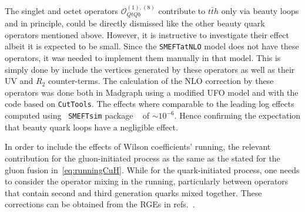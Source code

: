 %
\par The singlet and octet operators $\mathcal{O}_{QtQb}^{(1),(8)}$  contribute to $t \bar{t} h$ only via beauty loops and in principle, could be directly dismissed like the other beauty quark operators mentioned above. However, it is instructive to investigate their effect albeit it is expected to be small.
 Since the \texttt{SMEFTatNLO} model  does not have these operators, it was needed to implement them manually in that model. This is simply done by include the vertices generated by these operators as well as their UV and $R_2$ counter-terms. The calculation of the NLO correction by these operators was done both in Madgraph using a modified UFO model and with the code based on  \texttt{CutTools}. The effects where comparable to the leading log effects computed using ~\texttt{SMEFTsim} package ~\cite{Brivio:2017btx} of $ \sim 10^{-6}$. Hence confirming the expectation that beauty quark loops have a negligible effect. 
%
\par In order to include the effects of Wilson coefficients' running, the relevant contribution for the gluon-initiated process as the same as the stated for the gluon fusion in~\eqref{eq:runningCuH}. While for the quark-initiated process, one needs to consider the operator mixing in the running, particularly between operators that contain second and third generation quarks mixed together. These corrections can be obtained from the RGEs in refs.~\cite{Jenkins:2013zja,Jenkins:2013wua,Alonso:2013hga}.
